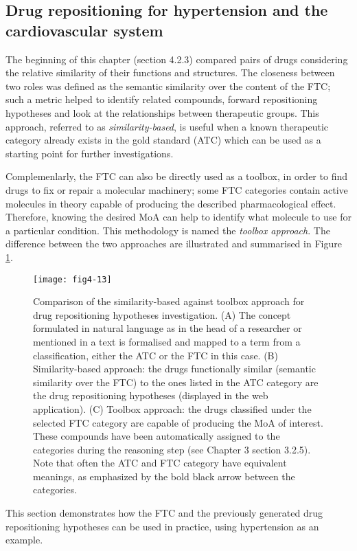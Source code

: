 \subsection{Drug repositioning for hypertension and the cardiovascular system}
The beginning of this chapter (section 4.2.3) compared pairs of drugs considering the relative similarity of their functions and structures. The closeness between two roles was defined as the semantic similarity over the content of the FTC; such a metric helped to identify related compounds, forward repositioning hypotheses and look at the relationships between therapeutic groups. This approach, referred to as \emph{similarity-based}, is useful when a known therapeutic category already exists in the gold standard (ATC) which can be used as a starting point for further investigations.

Complemenlarly, the FTC can also be directly used as a toolbox, in order to find drugs to fix or repair a molecular machinery; some FTC categories contain active molecules in theory capable of producing the described pharmacological effect. Therefore, knowing the desired MoA can help to identify what molecule to use for a particular condition. This methodology is named the \emph{toolbox approach}. The difference between the two approaches are illustrated and summarised in Figure \ref{fig4-13}.

\begin{figure}[ht]
    \centering
    \texttt{[image: fig4-13]}
    \caption{Comparison of the similarity-based against toolbox approach for drug repositioning hypotheses investigation. (A) The concept formulated in natural language as in the head of a researcher or mentioned in a text is formalised and mapped to a term from a classification, either the ATC or the FTC in this case. (B) Similarity-based approach: the drugs functionally similar (semantic similarity over the FTC) to the ones listed in the ATC category are the drug repositioning hypotheses (displayed in the web application). (C) Toolbox approach: the drugs classified under the selected FTC category are capable of producing the MoA of interest. These compounds have been automatically assigned to the categories during the reasoning step (see Chapter 3 section 3.2.5). Note that often the ATC and FTC category have equivalent meanings, as emphasized by the bold black arrow between the categories.}
    \label{fig4-13}
\end{figure}

This section demonstrates how the FTC and the previously generated drug repositioning hypotheses can be used in practice, using hypertension as an example.

